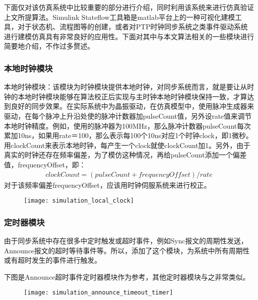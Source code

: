 下面仅对该仿真系统中比较重要的部分进行介绍，同时利用该系统来进行仿真验证上文所提算法。Simulink Stateflow工具箱是matlab平台上的一种可视化建模工具，对于状态机、流程图等的创建，或者对PTP时钟同步系统之类事件驱动系统进行建模仿真具有非常良好的应用性。下面对其中与本文算法相关的一些模块进行简要地介绍，不作过多赘述。

\subsubsection{本地时钟模块}
本地时钟模块：该模块为时钟模块提供本地时钟，对同步系统而言，就是要让从时钟的本地时钟模块能够在算法校正后实现与主时钟本地时钟模块保持一致，才算达到良好的同步效果。在实际系统中为晶振驱动，在仿真模型中，使用脉冲生成器来驱动，在每个脉冲上升沿处使的脉冲计数器加pulseCount值，另外设rate值来调节本地时钟精度。例如，使用的脉冲器为100MHz，那么脉冲计数器pulseCount每次累加10ns，如果用rate＝100，那么表示每100个10ns对应1个时钟clock，即1微秒。用clockCount来表示本地时钟，每产生一个clock就使clockCount加1。另外，由于真实的时钟还存在频率偏差，为了模仿这种情况，再给pulseCount添加一个偏差值，frequencyOffset，即：
\begin{align}
  clockCount = (pulseCount + frequencyOffset) / rate
\end{align}
对于该频率偏差frequencyOffset，应该用时钟伺服系统来进行校正。
\begin{figure}[!hbp]
  \centering
  \begin{minipage}[b]{1\textwidth}
    \captionstyle{\centering}
    \centering
    \texttt{[image: simulation\_local\_clock]}
  \end{minipage}     
\end{figure}

\subsubsection{定时器模块}
由于同步系统中存在很多中定时触发或超时事件，例如Sync报文的周期性发送，Announce报文的超时等待事件等。所以，添加了这个模块，为系统中所有周期性或有超时发生的事件进行触发。

下图是Announce超时事件定时器模块作为参考，其他定时器模块与之非常类似。
\begin{figure}[!hbp]
  \centering
  \begin{minipage}[b]{1\textwidth}
    \captionstyle{\centering}
    \centering
    \texttt{[image: simulation\_announce\_timeout\_timer]}
  \end{minipage}     
\end{figure}

